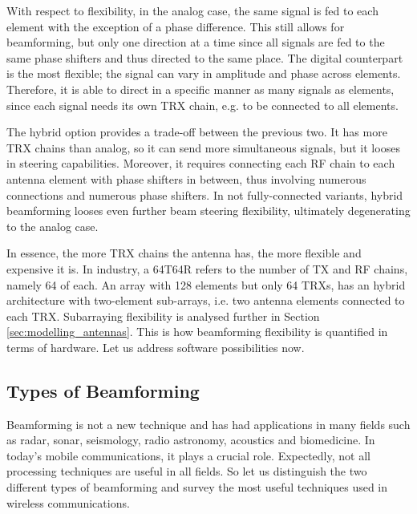 With respect to flexibility, in the analog case, the same signal is fed to each element with the exception of a phase difference. This still allows for beamforming, but only one direction at a time since all signals are fed to the same phase shifters and thus directed to the same place. The digital counterpart is the most flexible; the signal can vary in amplitude and phase across elements. Therefore, it is able to direct in a specific manner as many signals as elements, since each signal needs its own TRX chain, e.g. to be connected to all elements.

The hybrid option provides a trade-off between the previous two. It has more TRX chains than analog, so it can send more simultaneous signals, but it looses in steering capabilities. Moreover, it requires connecting each RF chain to each antenna element with phase shifters in between, thus involving numerous connections and numerous phase shifters. In not fully-connected variants, hybrid beamforming looses even further beam steering flexibility, ultimately degenerating to the analog case.


In essence, the more TRX chains the antenna has, the more flexible and expensive it is. In industry, a 64T64R refers to the number of TX and RF chains, namely 64 of each. An array with 128 elements but only 64 \acsp{TRX}, has an hybrid architecture with two-element sub-arrays, i.e. two antenna elements connected to each TRX. Subarraying flexibility is analysed further in Section \ref{sec:modelling_antennas}. This is how beamforming flexibility is quantified in terms of hardware. Let us address software possibilities now.


\subsection*{Types of Beamforming} \label{sec:types_of_beamforming}

Beamforming is not a new technique \cite{6591907} and has had applications in many fields such as radar, sonar, seismology, radio astronomy, acoustics and biomedicine. In today's mobile communications, it plays a crucial role. Expectedly, not all processing techniques are useful in all fields. So let us distinguish the two different types of beamforming and survey the most useful techniques used in wireless communications.

